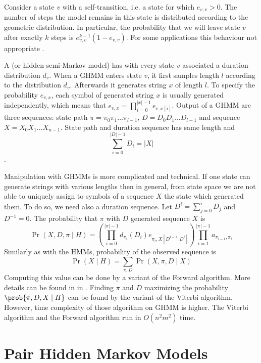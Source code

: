 Consider a state $v$ with a self-transition, i.e. a state for which $e_{v,v}>0$.
The number of steps the model remains in this state is distributed according to
the geometric distribution.
In particular, the probability that we will leave state $v$ after exactly $k$ steps is
$e_{v,v}^{k-1}(1-e_{v,v})$. For some
applications this behaviour not
appropriate \cite{Burge1997,Majoros2004}.

A  (or hidden semi-Markov model)
has with every state $v$ associated a duration distribution $d_v$.  When
a GHMM enters state $v$, it first samples length $l$ according
to the distribution $d_v$.  Afterwards it generates string $x$ of length $l$.  To
specify the probability $e_{v,x}$, each symbol of generated string $x$ is usually
generated independently, which means that $e_{v,x}=\prod_{i=0}^{|x|-1}e_{v,x[i]}$.
Output of a GHMM are three sequences: state path $\pi=\pi_0\pi_1\dots\pi_{l-1}$,
 $D=D_0D_1\dots D_{l-1}$ and sequence
$X=X_0X_1\dots X_{n-1}$.  State path and duration sequence has same
length and \[\sum_{i=0}^{|D|-1}D_i = |X|\].

Manipulation with GHMMs is  more complicated and technical. If one state can
generate strings with various lengths then in general, from state space we are
not able to uniquely assign to symbols of a sequence $X$ the state which 
generated them.
To do so, we need also a duration sequence.
Let $D^i = \sum_{j=0}^{i}D_j$ and $D^{-1}=0$.
The probability that $\pi$ with $D$ generated sequence $X$ is
\begin{equation}
\Pr(X,D,\pi\mid H) = 
\left(
\prod_{i=0}^{|\pi|-1}
d_{\pi_i}(D_i)e_{\pi_i,X[D^{i-1}:D^i]}
\right)
\prod_{i=1}^{|\pi|-1}
a_{\pi_{i-1},\pi_i}
\end{equation}
Similarly as with the HMMs,  probability of the observed
sequence is
\begin{equation}
\Pr\left(X\mid H\right) = \sum_{\pi,D}\Pr\left(X,\pi,D\mid X\right)
\end{equation}
Computing this value can be done by a variant of the Forward algorithm. More
details can be found in  in \cite{Burge1997,Majoros2004}. Finding $\pi$ and $D$
maximizing the probability $\prob{\pi,D,X\mid H}$ can be found by the variant of
the Viterbi algorithm. However, time complexity of those algorithm on GHMM is
higher. The Viterbi algorithm and the Forward algorithm run in $O(n^2m^2)$ time.

\section{Pair Hidden Markov Models}\label{SECTION:PAIRHMM}

